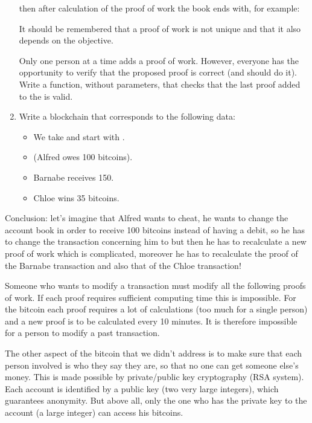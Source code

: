 \documentclass[11pt,class=report,crop=false]{standalone}
\begin{document}
\begin{activite}
\begin{enumerate}
  then after calculation of the proof of work the book ends with, for example:  
  
     It should be remembered that a proof of work is not unique and that it also depends on the  objective.
   
   Only one person at a time adds a proof of work. However, everyone has the opportunity to verify that the proposed proof is correct (and should do it). 
	Write a  function, without parameters, that checks that the last proof added to the  is valid.
	
	\item Write a blockchain that corresponds to the following data:
	\begin{itemize}
	  \item We take  and start with .
	  \item {} (Alfred owes 100 bitcoins).
	  \item Barnabe receives 150.
	  \item Chloe wins 35 bitcoins.
	\end{itemize}

\end{enumerate} 


Conclusion: let's imagine that Alfred wants to cheat, he wants to change the account book in order to receive 100 bitcoins instead of having a debit, so he has to change the transaction concerning him to  but then he has to recalculate a new proof of work which is complicated, moreover he has to recalculate the proof of the Barnabe transaction and also that of the Chloe transaction! 

Someone who wants to modify a transaction must modify all the following proofs of work. If each proof requires sufficient computing time this is impossible. For the bitcoin each proof requires a lot of calculations (too much for a single person) and a new proof is to be calculated every 10 minutes. It is therefore impossible for a person to modify a past transaction.

\end{activite}


The other aspect of the bitcoin that we didn't address is to make sure that each person involved is who they say they are, so that no one can get someone else's money. This is made possible by private/public key cryptography (RSA system). Each account is identified by a public key (two very large integers), which guarantees anonymity. But above all, only the one who has the private key to the account (a large integer) can access his bitcoins.
\end{document}
